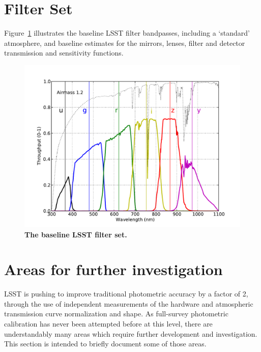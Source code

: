 \documentclass[12pt,preprint]{aastex}
\begin{document}
\appendix

\newpage
\section{Filter Set}

Figure~\ref{fig:filterset} illustrates the baseline LSST filter
bandpasses, including a `standard' atmosphere, and baseline estimates
for the mirrors, lenses, filter and detector transmission and
sensitivity functions. 

\begin{figure}[h!]
\centering
\includegraphics[width=5in]{filters}
\caption{{\small {\bf The baseline LSST filter set.}}
\label{fig:filterset}}
\end{figure}


\section{Areas for further investigation}
\label{sec:investigation}

LSST is pushing to improve traditional photometric accuracy by a
factor of 2, through the use of independent measurements of the
hardware and atmospheric transmission curve normalization and
shape. As full-survey photometric calibration has never been attempted
before at this level, there are understandably many areas which
require further development and investigation.  This section is
intended to briefly document some of those areas.
\end{document}

